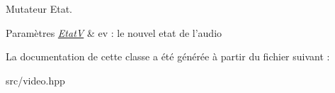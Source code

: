 Mutateur Etat. 


\begin{DoxyParams}{Paramètres}
{\em \hyperlink{classEtatV}{Etat\+V}} & ev \+: le nouvel etat de l'audio \\
\hline
\end{DoxyParams}


La documentation de cette classe a été générée à partir du fichier suivant \+:\begin{DoxyCompactItemize}
\item 
src/video.\+hpp\end{DoxyCompactItemize}

